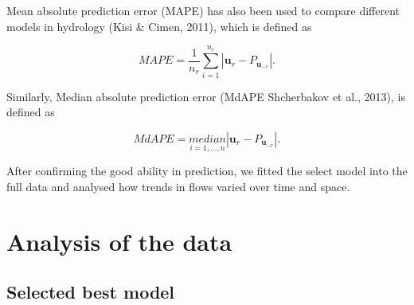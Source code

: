 \documentclass[12pt,oneside]{reedthesis}
\begin{document}
Mean absolute prediction error (MAPE) has also been used to compare different models in hydrology (Kisi \& Cimen, 2011), which is defined as

\[MAPE=\frac{1}{n_r}\sum_{i=1}^{n_r}|\pmb{u}_{r}-P_{\pmb{u}_{-r}}|.\]

Similarly, Median absolute prediction error (MdAPE Shcherbakov et al., 2013), is defined as

\[MdAPE=\underset {i=1,\dots,n} {median}|\pmb{u}_{r}-P_{\pmb{u}_{-r}}|.\]

After confirming the good ability in prediction, we fitted the select model into the full data and analysed how trends in flows varied over time and space.

\hypertarget{conclusion}{%
\chapter{Analysis of the data}\label{conclusion}}

\hypertarget{selected-best-model}{%
\section{Selected best model}\label{selected-best-model}}
\end{document}
